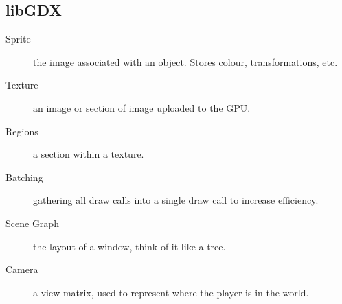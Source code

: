 \documentclass[landscape]{cheat}
\begin{document}
\begin{multicols*}{3}
\section{libGDX}
\begin{description}
    \item[Sprite] the image associated with an object.
        Stores colour, transformations, etc.
    \item[Texture] an image or section of image uploaded to the GPU.
    \item[Regions] a section within a texture.
    \item[Batching] gathering all draw calls into a single draw call to increase efficiency.
    \item[Scene Graph] the layout of a window, think of it like a tree.
    \item[Camera] a view matrix, used to represent where the player is in the world.
\end{description}

\end{multicols*}
\end{document}
